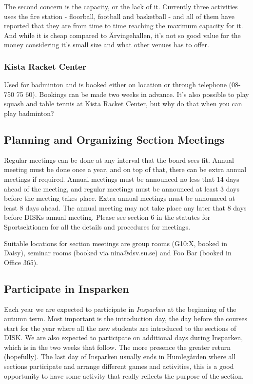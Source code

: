 \documentclass[12pt,a4paper]{article}
\begin{document}
			The second concern is the capacity, or the lack of it. Currently three activities uses the fire station - floorball, football and basketball -  and all of them have reported that they are from time to time reaching the maximum capacity for it. And while it is cheap compared to Ärvingehallen, it's not so good value for the money considering it's small size and what other venues has to offer.
			\subsubsection{Kista Racket Center}
			Used for badminton and is booked either on location or through telephone (08-750 75 60). Bookings can be made two weeks in advance. It's also possible to play squash and table tennis at Kista Racket Center, but why do that when you can play badminton?
		\subsection{Planning and Organizing Section Meetings}
		Regular meetings can be done at any interval that the board sees fit. Annual meeting must be done once a year, and on top of that, there can be extra annual meetings if required. Annual meetings must be announced no less that 14 days ahead of the meeting, and regular meetings must be announced at least 3 days before the meeting takes place. Extra annual meetings must be announced at least 8 days ahead. The annual meeting may not take place any later that 8 days before DISKs annual meeting. Please see section 6 in the statutes for Sportsektionen for all the details and procedures for meetings.

		Suitable locations for section meetings are group rooms (G10:X, booked in Daisy), seminar rooms (booked via nina@dsv.su.se) and Foo Bar (booked in Office 365).
		\subsection{Participate in Insparken}
		Each year we are expected to participate in \emph{Insparken} at the beginning of the autumn term. Most important is the introduction day, the day before the courses start for the year where all the new students are introduced to the sections of DISK. We are also expected to participate on additional days during Insparken, which is in the two weeks that follow. The more presence the greater return (hopefully). The last day of Insparken usually ends in Humlegården where all sections participate and arrange different games and activities, this is a good opportunity to have some activity that really reflects the purpose of the section.
\end{document}
